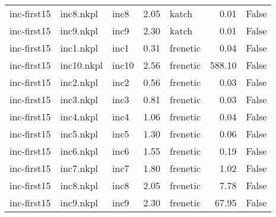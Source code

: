 \begin{tabular}{lllrlrr}
inc-first15 & inc8.nkpl & inc8 & 2.05 & katch & 0.01 & False \\
inc-first15 & inc9.nkpl & inc9 & 2.30 & katch & 0.01 & False \\
inc-first15 & inc1.nkpl & inc1 & 0.31 & frenetic & 0.04 & False \\
inc-first15 & inc10.nkpl & inc10 & 2.56 & frenetic & 588.10 & False \\
inc-first15 & inc2.nkpl & inc2 & 0.56 & frenetic & 0.03 & False \\
inc-first15 & inc3.nkpl & inc3 & 0.81 & frenetic & 0.03 & False \\
inc-first15 & inc4.nkpl & inc4 & 1.06 & frenetic & 0.04 & False \\
inc-first15 & inc5.nkpl & inc5 & 1.30 & frenetic & 0.06 & False \\
inc-first15 & inc6.nkpl & inc6 & 1.55 & frenetic & 0.19 & False \\
inc-first15 & inc7.nkpl & inc7 & 1.80 & frenetic & 1.02 & False \\
inc-first15 & inc8.nkpl & inc8 & 2.05 & frenetic & 7.78 & False \\
inc-first15 & inc9.nkpl & inc9 & 2.30 & frenetic & 67.95 & False \\
\bottomrule
\end{tabular}

